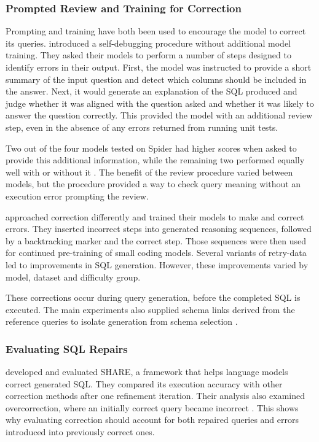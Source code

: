 \subsubsection{Prompted Review and Training for Correction}

Prompting and training have both been used to encourage the model to correct its queries. 
\citet{chen2024selfdebug} introduced a self-debugging procedure without additional model training. 
They asked their models to perform a number of steps designed to identify errors in their output. 
First, the model was instructed to provide a short summary 
of the input question and detect which columns should be included in the answer. 
Next, it would generate an explanation of the SQL produced and judge 
whether it was aligned with the question asked and whether 
it was likely to answer the question correctly. 
This provided the model with an additional review step, 
even in the absence of any errors returned from running unit tests.

Two out of the four models tested on Spider 
had higher scores when asked to provide this additional information, 
while the remaining two performed equally well with or without it \citep[Table~2(a)]{chen2024selfdebug}. 
The benefit of the review procedure varied between models, 
but the procedure provided a way to check query meaning without an execution error prompting the review.

\citet{raczkowska2026retrysql} approached correction differently 
and trained their models to make and correct errors. 
They inserted incorrect steps into generated reasoning sequences, 
followed by a backtracking marker and the correct step. 
Those sequences were then used for continued pre-training of small coding models. 
Several variants of retry-data led to improvements in SQL generation. 
However, these improvements varied by model, dataset and difficulty group.

These corrections occur during query generation, before the completed SQL
is executed. The main experiments also supplied schema links derived from
the reference queries to isolate generation from schema selection
\citep{raczkowska2026retrysql}.

\subsubsection{Evaluating SQL Repairs}

\citet{qu2025share} developed and evaluated SHARE, a framework that helps
language models correct generated SQL. They compared its execution accuracy
with other correction methods after one refinement iteration.
Their analysis also examined overcorrection, where an initially correct
query became incorrect \citep[Appendix~C.4]{qu2025share}.
This shows why evaluating correction should account for both repaired
queries and errors introduced into previously correct ones.

